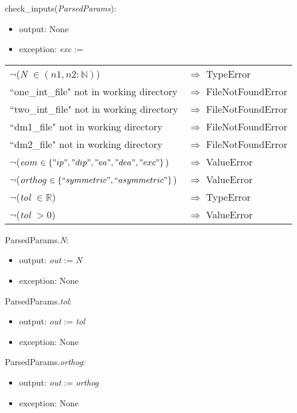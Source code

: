 \documentclass[12pt, titlepage]{article}
\begin{document}
\noindent check\_inputs(\textit{ParsedParams}):
\begin{itemize}
	\item output: None 
	\item exception: \textit{exc} :=  
\end{itemize}
\noindent \begin{longtable*}[l]{l l}
	$\neg$(\textit{N} $\in (n1, n2:\mathbb{N})$) & $\Rightarrow$ TypeError\\
	``one\_int\_file" not in working directory & $\Rightarrow$ 
	FileNotFoundError\\
	``two\_int\_file" not in working directory & $\Rightarrow$ 
	FileNotFoundError\\
	``dm1\_file" not in working directory & $\Rightarrow$ 
	FileNotFoundError\\
	``dm2\_file" not in working directory & $\Rightarrow$ 
	FileNotFoundError\\
	$\neg$(\textit{eom} $\in \{"ip", "dip", "ea", "dea", "exc"\}$)  & 
	$\Rightarrow$ ValueError\\
	$\neg$(\textit{orthog} $\in \{``symmetric", ``asymmetric"\}$) & 
	$\Rightarrow$ ValueError\\
	$\neg$(\textit{tol} $\in \mathbb{R}$) & $\Rightarrow$ TypeError\\
	$\neg$(\textit{tol} $> 0$) & $\Rightarrow$ ValueError\\
\end{longtable*}

\noindent ParsedParams.\textit{N}:
\begin{itemize}
	\item output: \textit{out} := \textit{N} 
	\item exception: None 
\end{itemize}

\noindent ParsedParams.\textit{tol}:
\begin{itemize}
	\item output: \textit{out} := \textit{tol} 
	\item exception: None 
\end{itemize}

\noindent ParsedParams.\textit{orthog}:
\begin{itemize}
	\item output: \textit{out} := \textit{orthog} 
	\item exception: None 
\end{itemize}
\end{document}
